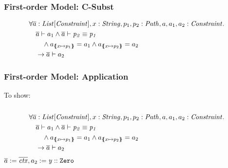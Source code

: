 \begin{frame}
\frametitle{First-order Model: C-Subst}
\begin{prooftree}
\end{prooftree}
\vfill
\begin{align*}
&\forall \ovl a: \Constrs, x: \String, p_1, p_2: \Path, a, a_1, a_2: \Constr. \\
&\quad \entails{\ovl a}{a_1}
         \land \entails{\ovl a}{\pathEq{p_2}{p_1}}\\
&\qquad  \land a_{\sub{x}{p_1}} = a_1 \land a_{\sub{x}{p_2}} = a_2\\
&\quad   \rightarrow \entails{\ovl a}{a_2}
\end{align*}
\end{frame}


\begin{frame}[t]
\frametitle{First-order Model: Application}
To show: 
\quad\\\quad\\
\begin{align*}
&\forall \ovl a: \Constrs, x: \String, p_1, p_2: \Path, a, a_1, a_2: \Constr. \\
&\quad \entails{\ovl a}{a_1}
         \land \entails{\ovl a}{\pathEq{p_2}{p_1}}\\
&\qquad  \land a_{\sub{x}{p_1}} = a_1 \land a_{\sub{x}{p_2}} = a_2\\
&\quad   \rightarrow \entails{\ovl a}{a_2}
\end{align*}
\pause
\onslide<+->
$\ovl a := \ovl{\mIt{ctx}}, a_2 := \instOf{y}{\texttt{Zero}}$
\end{frame}

